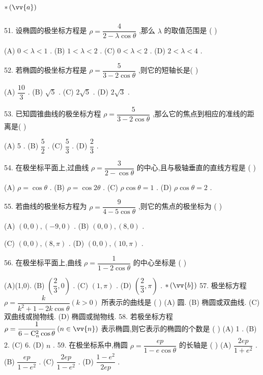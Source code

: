 \section*{$* \left( \vv{a}\right)$}

51. 设椭圆的极坐标方程是 $\rho  = \dfrac{4}{2 - \lambda \cos \theta }$ ,那么 $\lambda$ 的取值范围是 (   )

(A) $0 < \lambda  < 1$ . (B) $1 < \lambda  < 2$ . (C) $0 < \lambda  < 2$ . (D) $2 < \lambda  < 4$ .

52. 若椭圆的极坐标方程是 $\rho  = \dfrac{5}{3 - 2\cos \theta }$ ,则它的短轴长是(   )

(A) $\dfrac{10}{3}$ . (B) $\sqrt{5}$ . (C) $2\sqrt{5}$ . (D) $2\sqrt{3}$ .

53. 已知圆锥曲线的极坐标方程 $\rho  = \dfrac{5}{3 - 2\cos \theta }$ ,那么它的焦点到相应的准线的距离是(   )

(A) 5 . (B) $\dfrac{5}{2}$ . (C) $\dfrac{5}{3}$ . (D) $\dfrac{2}{3}$ .

54. 在极坐标平面上,过曲线 $\rho  = \dfrac{3}{2 - \cos \theta }$ 的中心,且与极轴垂直的直线方程是 (   )

(A) $\rho  = \cos \theta$ . (B) $\rho  = \cos {2\theta }$ . (C) $\rho \cos \theta  = 1$ . (D) $\rho \cos \theta  = 2$ .

55. 若曲线的极坐标方程为 $\rho  = \dfrac{9}{4 - 5\cos \theta }$ ,则它的焦点的极坐标为 (   )

(A) $\left( {0,0}\right) ,\left( {-9,0}\right)$ . (B) $\left( {0,0}\right) ,\left( {8,0}\right)$ .

(C) $\left( {0,0}\right) ,\left( {8,\pi }\right)$ . (D) $\left( {0,0}\right) ,\left( {{10},\pi }\right)$ .

56. 在极坐标平面上,曲线 $\rho  = \dfrac{1}{1 - 2\cos \theta }$ 的中心坐标是 (   )

(A)(1,0). (B) $\left( {\dfrac{2}{3},0}\right)$ . (C) $\left( {1,\pi }\right)$ . (D) $\left( {\dfrac{2}{3},\pi }\right)$ . $* \left( \vv{b}\right)$ 57. 极坐标方程 $\rho  = \dfrac{k}{{k}^{2} + 1 - {2k}\cos \theta }\left( {k > 0}\right)$ 所表示的曲线是 (   ) (A) 圆. (B) 椭圆或双曲线. (C) 双曲线或抛物线. (D) 椭圆或抛物线. 58. 若极坐标方程 $\rho  = \dfrac{1}{6 - {\mathrm{C}}_{n}^{2}\cos \theta }\left( {n \in  \vv{n}}\right)$ 表示椭圆,则它表示的椭圆的个数是 (   ) (A) 1 . (B) 2. (C) 6. (D) $n$ . 59. 在极坐标系中,椭圆 $\rho  = \dfrac{ep}{1 - e\cos \theta }$ 的长轴是 (   ) (A) $\dfrac{2ep}{1 + {e}^{2}}$ . (B) $\dfrac{ep}{1 - {e}^{2}}$ . (C) $\dfrac{2ep}{1 - {e}^{2}}$ . (D) $\dfrac{1 - {e}^{2}}{2ep}$ .

